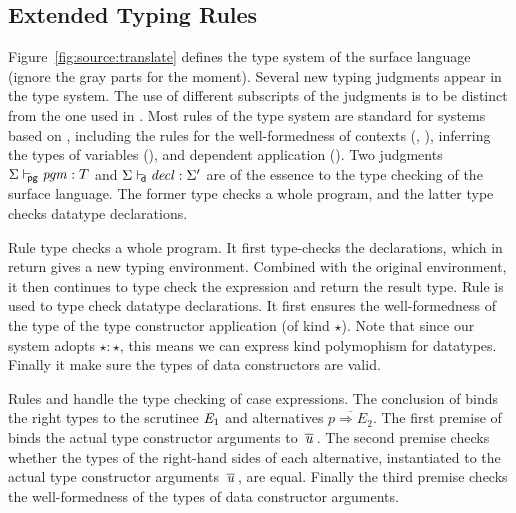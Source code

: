 \subsection{Extended Typing Rules}

Figure~\ref{fig:source:translate} defines the type system of the
surface language (ignore the gray parts for the moment). Several new
typing judgments appear in the type system. The use of different
subscripts of the judgments is to be distinct from the one used in
\name. Most rules of the type system are standard for systems based on
\coc, including the rules for the well-formedness of contexts
(, ), inferring the types of
variables (), and dependent application
(). Two judgments $ \Sigma  \vdash_{\!\!\mathsf{pg} }  \mathit{pgm}  :  T $ and
$ \Sigma  \vdash_{\!\!\mathsf{d} }  \mathit{decl}  :  \Sigma' $ are of the essence to the type checking of the
surface language. The former type checks a whole program, and the
latter type checks datatype declarations.

Rule  type checks a whole program. It first
type-checks the declarations, which in return gives a new typing
environment. Combined with the original environment, it then continues
to type check the expression and return the result type. Rule
 is used to type check datatype declarations. It
first ensures the well-formedness of the type of the type constructor
application (of kind $\star$). Note that since our system adopts
$\star : \star$, this means we can express kind polymophism for
datatypes. Finally it make sure the types of data constructors are
valid.

Rules  and  handle the type
checking of case expressions. The conclusion of 
binds the right types to the scrutinee $\mathit{E_{{\mathrm{1}}}}$ and alternatives
$\overline{p \Rightarrow E_2}$. The first premise of
 binds the actual type constructor arguments to
$\,\overline{  \mathit{u}  }\,$. The second premise checks whether the types of the
right-hand sides of each alternative, instantiated to the actual type
constructor arguments $\,\overline{  \mathit{u}  }\,$, are equal. Finally the third
premise checks the well-formedness of the types of data constructor
arguments.   

